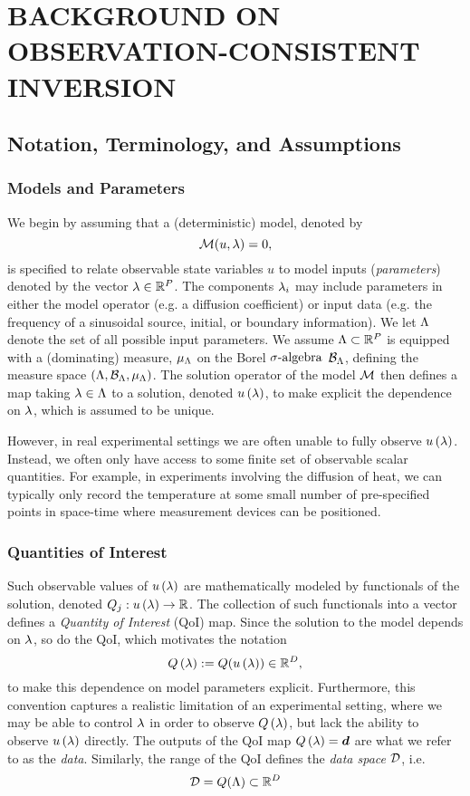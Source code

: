 \chapter{\uppercase{Background on Observation-Consistent Inversion} \label{chapter:02}}

\section{Notation, Terminology, and Assumptions}
\subsection{Models and Parameters}
We begin by assuming that a (deterministic) model, denoted by $$\mathcal{M} (u, \lambda) = 0,$$ is specified to relate observable state variables $u$ to model inputs ({\em parameters}) denoted by the vector $\lambda\in\mathbb{R}^P$.
The components $\lambda_i$ may include parameters in either the model operator (e.g. a diffusion coefficient) or input data (e.g. the frequency of a sinusoidal source, initial, or boundary information).
We let ${\Lambda}$ denote the set of all possible input parameters.
We assume ${\Lambda}\subset\mathbb{R}^P$ is equipped with a (dominating) measure, $\mu_{{\Lambda}}$ on the Borel $\sigma\text{-algebra}$ $\mathcal{B}_{{\Lambda}}$, defining the measure space $({\Lambda}, \mathcal{B}_{{\Lambda}}, \mu_{{\Lambda}})$.
The solution operator of the model $\mathcal{M}$ then defines a map taking $\lambda\in{\Lambda}$ to a solution, denoted $u\left ( \lambda \right )$, to make explicit the dependence on $\lambda$, which is assumed to be unique.

However, in real experimental settings we are often unable to fully observe $u\left ( \lambda \right )$.
Instead, we often only have access to some finite set of observable scalar quantities.
For example, in experiments involving the diffusion of heat, we can typically only record the temperature at some small number of pre-specified points in space-time where measurement devices can be positioned.

\subsection{Quantities of Interest}
Such observable values of $u\left ( \lambda \right )$ are mathematically modeled by functionals of the solution, denoted $Q_j: u\left ( \lambda \right ) \to \mathbb{R}$.
The collection of such functionals into a vector defines a {\em Quantity of Interest} (QoI) map.
Since the solution to the model depends on $\lambda$, so do the QoI, which motivates the notation
$$Q\left ( \lambda \right ) := Q( u\left ( \lambda \right ) ) \in\mathbb{R}^D,$$
to make this dependence on model parameters explicit.
Furthermore, this convention captures a realistic limitation of an experimental setting, where we may be able to control $\lambda$ in order to observe $Q\left ( \lambda \right )$, but lack the ability to observe $u\left ( \lambda \right )$ directly.
The outputs of the QoI map $Q\left ( \lambda \right ) = \operatorname*{\boldsymbol{d}}$ are what we refer to as the \emph{data}.
Similarly, the range of the QoI defines the \emph{data space} $\mathcal{D}$, i.e.
$$\mathcal{D} = Q({\Lambda}) \subset \mathbb{R}^D$$


